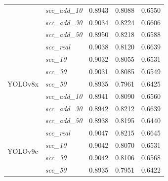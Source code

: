 \begin{table}[h!]
{\begin{tabular}{l|l|c|c|c}
                                      & \textit{scc\_add\_10}   & 0.8943                     & 0.8088                     & 0.6550                     \\
                                      & \textit{scc\_add\_30}   & 0.9034                     & \cellcolor{blue!10}0.8224  & 0.6606                     \\
                                      & \textit{scc\_add\_50}   & 0.8950                     & 0.8218                     & 0.6588                     \\
        \midrule
        \multirow[t]{7}{*}{YOLOv8x}   & \textit{scc\_real}      & \cellcolor{blue!10}0.9038  & 0.8120                     & \cellcolor{blue!10}0.6639  \\
                                      & \textit{scc\_10}        & 0.9032                     & 0.8055                     & 0.6531                     \\
                                      & \textit{scc\_30}        & 0.9031                     & 0.8085                     & 0.6549                     \\
                                      & \textit{scc\_50}        & 0.8935                     & 0.7961                     & 0.6425                     \\
                                      & \textit{scc\_add\_10}   & 0.8941                     & 0.8090                     & 0.6560                     \\
                                      & \textit{scc\_add\_30}   & 0.8942                     & \cellcolor{blue!10}0.8212  & \cellcolor{blue!10}0.6639  \\
                                      & \textit{scc\_add\_50}   & 0.8938                     & 0.8195                     & 0.6440                     \\
        \midrule
        \multirow[t]{7}{*}{YOLOv9c}   & \textit{scc\_real}      & \cellcolor{blue!10}0.9047  & 0.8215                     & \cellcolor{blue!10}0.6645  \\
                                      & \textit{scc\_10}        & 0.9042                     & 0.8070                     & 0.6531                     \\
                                      & \textit{scc\_30}        & 0.9042                     & 0.8106                     & 0.6568                     \\
                                      & \textit{scc\_50}        & 0.8935                     & 0.7951                     & 0.6422                     \\

\end{tabular}}
\end{table}
